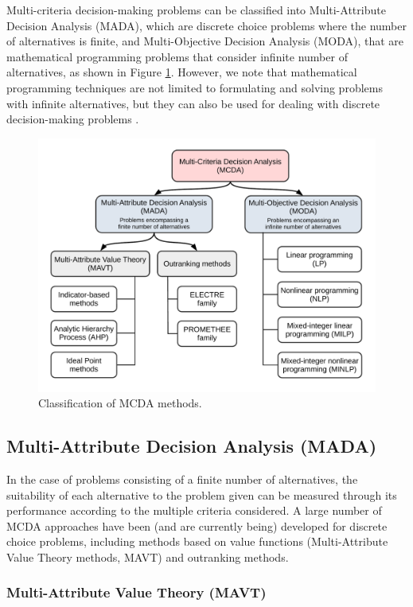 \begin{refsection}[referencesCh1]
Multi-criteria decision-making problems can be classified into Multi-Attribute Decision Analysis (MADA), which are discrete choice problems where the number of alternatives is finite, and Multi-Objective Decision Analysis (MODA), that are mathematical programming problems that consider infinite number of alternatives, as shown in Figure \ref{fig:Ch1MCDA}. However, we note that mathematical programming techniques are not limited to formulating and solving problems with infinite alternatives, but they can also be used for dealing with discrete decision-making problems \citep{giove2009decision}. 

\begin{figure}[h]
	\centering
	\includegraphics[width=0.9\linewidth, trim={1cm 1cm 1cm 1cm},clip]{gfx/Chapter1/IntroMCDA.pdf} 
	\caption{Classification of MCDA methods.}
	\label{fig:Ch1MCDA}
\end{figure}

\subsection{Multi-Attribute Decision Analysis (MADA)}

In the case of problems consisting of a finite number of alternatives, the suitability of each alternative to the problem given can be measured through its performance according to the multiple criteria considered. A large number of MCDA approaches have been (and are currently being) developed for discrete choice problems, including methods based on value functions (Multi-Attribute Value Theory methods, MAVT) and outranking methods.

\subsubsection{Multi-Attribute Value Theory (MAVT)}

\end{refsection}
